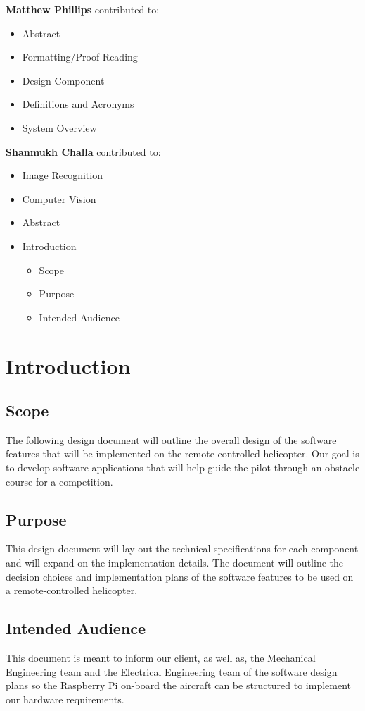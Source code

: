 \documentclass[onecolumn, oneside, letterpaper, draftclsnofoot, 10pt, compsoc]{IEEEtran}
\begin{document}
\noindent\textbf{Matthew Phillips} contributed to:
\begin{itemize}
    \item Abstract
    \item Formatting/Proof Reading
    \item Design Component
    \item Definitions and Acronyms
    \item System Overview
\end{itemize}

\noindent\textbf{Shanmukh Challa} contributed to:
\begin{itemize}
    \item Image Recognition
    \item Computer Vision
    \item Abstract
    \item Introduction
    \begin{itemize}
        \item Scope
        \item Purpose
        \item Intended Audience
    \end{itemize}
\end{itemize}

\newpage
\section{Introduction}
\subsection{Scope}
The following design document will outline the overall design of the software features that will be implemented on the remote-controlled helicopter. Our goal is to develop software applications that will help guide the pilot through an obstacle course for a competition.
\subsection{Purpose}
This design document will lay out the technical specifications for each component and will expand on the implementation details. The document will outline the decision choices and implementation plans of the software features to be used on a remote-controlled helicopter.

\subsection{Intended Audience}
This document is meant to inform our client, as well as, the Mechanical Engineering team and the Electrical Engineering team of the software design plans so the Raspberry Pi on-board the aircraft can be structured to implement our hardware requirements.
\end{document}
